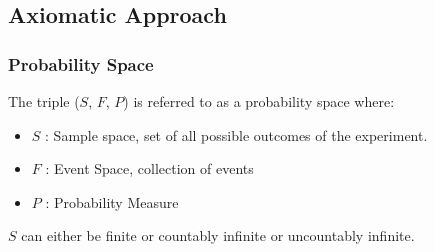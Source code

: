 \documentclass{article}
\begin{document}
         \subsection{Axiomatic Approach}

         \subsubsection{Probability Space}

The triple ($S$, $F$, $P$) is referred to as a probability space where:
\begin{itemize}
    \item $S$ : Sample space, set of all possible outcomes of the experiment.
    \item $F$ : Event Space, collection of events
    \item $P$ : Probability Measure
\end{itemize}

$S$ can either be finite or countably infinite or uncountably infinite.
\end{document}
